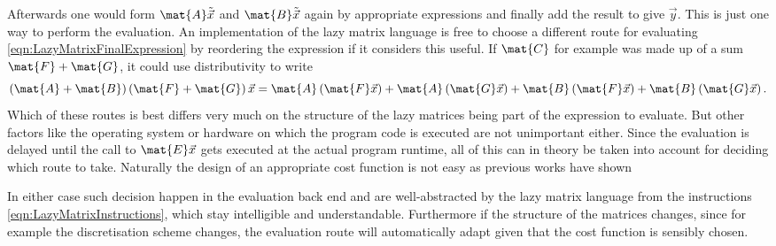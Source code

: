 Afterwards one would form $\mat{A} \tilde{\vec{x}}$ and $\mat{B} \tilde{\vec{x}}$
again by appropriate \contraction expressions
and finally add the result to give $\vec{y}$.
This is just one way to perform the evaluation.
An implementation of the lazy matrix language is free to choose
a different route for evaluating \eqref{eqn:LazyMatrixFinalExpression}
by reordering the expression if it considers this useful.
If $\mat{C}$ for example was made up of a sum $\mat{F} + \mat{G}$,
it could use distributivity to write
\[ \left( \mat{A} + \mat{B} \right) \left( \mat{F} + \mat{G} \right) \vec{x}
	= \mat{A} \left( \mat{F} \vec{x} \right) + \mat{A} \left( \mat{G}\vec{x}\right)
	+ \mat{B} \left( \mat{F} \vec{x} \right) + \mat{B} \left( \mat{G}\vec{x}\right).
\]
Which of these routes is best differs very much on the structure
of the lazy matrices being part of the expression to evaluate.
But other factors like the operating system or hardware on which
the program code is executed are not unimportant either.
Since the evaluation is delayed
until the call to $\mat{E}\vec{x}$ gets executed at the actual program runtime,
all of this can in theory be taken into account for deciding
which route to take.
Naturally the design of an appropriate cost function
is not easy as previous works have shown%
~\cite{Baumgartner2005,Solomonik2014,Peise2015,Calvin2015,Calvin2015arxiv,%
Kristensen2016array,Kristensen2016streaming}

In either case such decision happen in the evaluation back end
and are well-abstracted by the lazy matrix language
from the instructions \eqref{eqn:LazyMatrixInstructions},
which stay intelligible and understandable.
Furthermore if the structure of the matrices changes,
since for example the discretisation scheme changes,
the evaluation route will automatically adapt
given that the cost function is sensibly chosen.

%
%
\defineabbr{LA}{LA\xspace}{Linear algebra}
\pagebreak[2]
